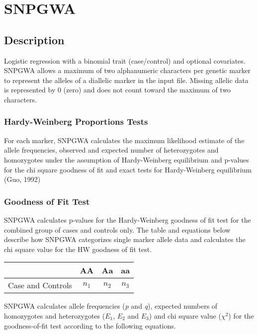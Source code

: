 
\section{SNPGWA}
\label{sec:snpgwa}
\subsection{Description}
Logistic regression with a binomial trait (case/control) and optional
covariates.  SNPGWA allows a maximum of two alphanumeric characters per genetic
marker to represent the alleles of a diallelic marker in the input file.
Missing allelic data is represented by 0 (zero) and does not count toward the
maximum of two characters.

\subsubsection{Hardy-Weinberg Proportions Tests}
For each marker, SNPGWA calculates the maximum likelihood estimate of the allele
frequencies, observed and expected number of heterozygotes and homozygotes under
the assumption of Hardy-Weinberg equilibrium and p-values for the chi square
goodness of fit and exact tests for Hardy-Weinberg equilibrium (Guo, 1992)

\subsubsection{Goodness of Fit Test}
\label{goodness-of-fit}
SNPGWA calculates p-values for the Hardy-Weinberg goodness of fit test for the
combined group of cases and controls only.  The table and equations below
describe how SNPGWA categorizes single marker allele data and calculates the chi
square value for the HW goodness of fit test.

\vspace{1em}
\begin{tabular}{rccc}
  \hline
  {} & \textbf{AA} & \textbf{Aa} & \textbf{aa} \\
  \hline
  Case and Controls & $n_1$ & $n_2$ & $n_3$ \\
  \hline
\end{tabular}
\vspace{1em}

SNPGWA calculates allele frequencies (\textit{p} and \textit{q}), expected
numbers of homozygotes and heterozygotes ($E_1$, $E_2$ and $E_3$) and chi square
value ($\chi^2$) for the goodness-of-fit test according to the following
equations.

